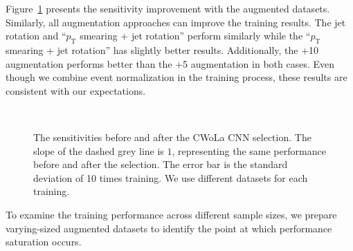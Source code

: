 \documentclass[12pt]{article}
\begin{document}
        Figure~\ref{fig:sensitivity_improvement_origin_pt_jet_aug_5_10_event_norm} presents the sensitivity improvement with the augmented datasets. Similarly, all augmentation approaches can improve the training results. The jet rotation and ``$p_{\text{T}}$ smearing + jet rotation'' perform similarly while the ``$p_{\text{T}}$ smearing + jet rotation'' has slightly better results. Additionally, the +10 augmentation performs better than the +5 augmentation in both cases. Even though we combine event normalization in the training process, these results are consistent with our expectations.
        \begin{figure}[htpb]
            \centering
             \\
            \caption{The sensitivities before and after the CWoLa CNN selection. The slope of the dashed grey line is $1$, representing the same performance before and after the selection. The error bar is the standard deviation of 10 times training. We use different datasets for each training.}
            \label{fig:sensitivity_improvement_origin_pt_jet_aug_5_10_event_norm}
        \end{figure}

        To examine the training performance across different sample sizes, we prepare varying-sized augmented datasets to identify the point at which performance saturation occurs.
\end{document}
